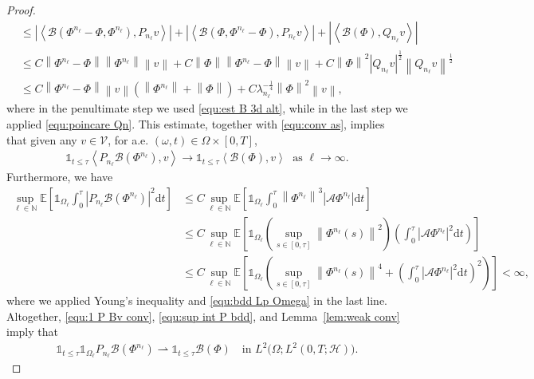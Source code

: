 \documentclass[11pt, reqno]{amsart}
\theoremstyle{definition}
\numberwithin{equation}{section}
\newcommand{\bb}{\mathbb}
\newcommand{\dt}{\mathrm{d}t}
\newcommand{\norm}[1]{\left\|{#1}\right\|}
\newcommand{\inpro}[2]{\left\langle#1,#2\right\rangle}
\newcommand{\abs}[1]{\left|{#1}\right|}
\newcommand{\one}{\mathds{1}}
\begin{document}
\begin{proof}
\begin{align*}
	&\leq
	\abs{\inpro{\mathcal{B}(\Phi^{n_\ell}-\Phi, \Phi^{n_\ell})}{P_{n_\ell} v}}
	+
	\abs{\inpro{\mathcal{B}(\Phi, \Phi^{n_\ell}-\Phi)}{P_{n_\ell} v}}
	+
	\abs{\inpro{\mathcal{B}(\Phi)}{Q_{n_\ell} v}}
	\\
	&\leq
	C \norm{\Phi^{n_\ell}-\Phi} \norm{\Phi^{n_\ell}} \norm{v}
	+
	C \norm{\Phi} \norm{\Phi^{n_\ell}-\Phi} \norm{v}
	+
	C \norm{\Phi}^2 \abs{Q_{n_\ell} v}^{\frac12} \norm{Q_{n_\ell} v}^{\frac12}
	\\
	&\leq
	C \norm{\Phi^{n_\ell}-\Phi} \norm{v} \left(\norm{\Phi^{n_\ell}}+ \norm{\Phi}\right) + C\lambda_{n_\ell}^{-\frac14} \norm{\Phi}^2 \norm{v},
\end{align*}
where in the penultimate step we used \eqref{equ:est B 3d alt}, while in the last step we applied \eqref{equ:poincare Qn}. This estimate, together with \eqref{equ:conv as}, implies that given any $v\in\mathcal{V}$, for a.e. $(\omega,t)\in \Omega\times [0,T]$,
\begin{align}\label{equ:1 P Bv conv}
	\one_{t\leq \tau} \inpro{P_{n_\ell}\mathcal{B}(\Phi^{n_\ell})}{v} \to \one_{t\leq \tau} \inpro{\mathcal{B}(\Phi)}{v}\; \text{ as $\ell\to\infty$}.
\end{align}
Furthermore, we have
\begin{align}\label{equ:sup int P bdd}
	\sup_{\ell\in \bb{N}} \bb{E}\left[\one_{\Omega_{\ell}} \int_0^\tau \abs{P_{n_\ell}\mathcal{B}(\Phi^{n_\ell})}^2 \dt \right]
	&\leq
	C\sup_{\ell\in \bb{N}} \bb{E} \left[\one_{\Omega_\ell} \int_0^\tau \norm{\Phi^{n_\ell}}^3 \abs{\mathcal{A}\Phi^{n_\ell}} \dt \right]
	\nonumber\\
	&\leq
	C \sup_{\ell\in \bb{N}} \bb{E} \left[\one_{\Omega_\ell} \left(\sup_{s\in [0,\tau]} \norm{\Phi^{n_\ell}(s)}^2 \right) \left(\int_0^\tau \abs{\mathcal{A}\Phi^{n_\ell}}^2 \dt\right)\right]
	\nonumber\\
	&\leq
	C \sup_{\ell\in \bb{N}} \bb{E} \left[\one_{\Omega_\ell} \left(\sup_{s\in [0,\tau]} \norm{\Phi^{n_\ell}(s)}^4 + \left(\int_0^\tau \abs{\mathcal{A}\Phi^{n_\ell}}^2 \dt \right)^2 \right)\right] < \infty,
\end{align}
where we applied Young's inequality and \eqref{equ:bdd Lp Omega} in the last line. Altogether, \eqref{equ:1 P Bv conv}, \eqref{equ:sup int P bdd}, and Lemma~\ref{lem:weak conv} imply that
\begin{align}\label{equ:one PB conv}
	\one_{t\leq \tau} \one_{\Omega_\ell}  P_{n_\ell} \mathcal{B}(\Phi^{n_\ell}) \rightharpoonup \one_{t\leq \tau} \mathcal{B}(\Phi) \quad \text{in } L^2\big(\Omega;L^2(0,T;\mathcal{H})\big).

\end{align}
\end{proof}
\end{document}
